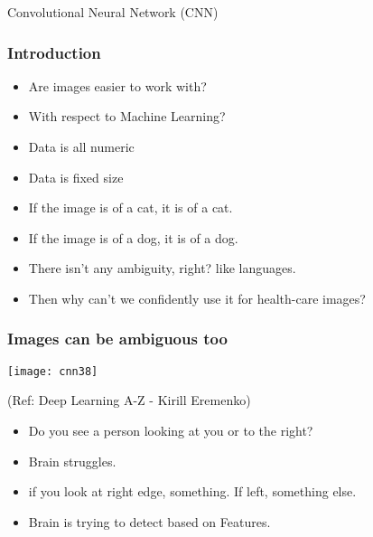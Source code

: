 \begin{frame}
  \begin{center}
    {\Large Convolutional Neural Network (CNN)}
  \end{center}
\end{frame}


\begin{frame}[fragile] \frametitle{Introduction}

\begin{itemize}
\item Are images easier to work with?
\item With respect to Machine Learning?
\item Data is all numeric
\item Data is fixed size
\item If the image is of a cat, it is of a cat.
\item If the image is of a dog, it is of a dog.
\item There isn't any ambiguity, right? like languages.
\item Then why can't we confidently use it for health-care images?
\end{itemize}


\end{frame}

\begin{frame}[fragile] \frametitle{Images can be ambiguous too}

\begin{center}
\texttt{[image: cnn38]}

\tiny{(Ref: Deep Learning A-Z - Kirill Eremenko)}
\end{center}

\begin{itemize}
\item  Do you see a person looking at you or to the right?
\item Brain struggles.
\item if you look at right edge, something. If left, something else.
\item Brain is trying to detect based on Features.
\end{itemize}


\end{frame}

